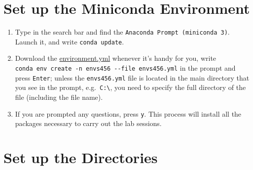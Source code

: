 \documentclass[
  letterpaper,
  DIV=11,
  numbers=noendperiod]{scrreprt}
\providecommand{\tightlist}{%
  \setlength{\itemsep}{0pt}\setlength{\parskip}{0pt}}\usepackage{longtable,booktabs,array}
\begin{document}
\section*{Set up the Miniconda
Environment}\label{set-up-the-miniconda-environment}


\begin{enumerate}
\def\labelenumi{\arabic{enumi}.}
\tightlist
\item
  Type in the search bar and find the
  \texttt{Anaconda\ Prompt\ (miniconda\ 3)}. Launch it, and write
  \texttt{conda\ update}.
\item
  Download the
  \href{https://github.com/GDSL-UL/wma/blob/main/envs456.yml}{environment.yml}
  whenever it's handy for you, write
  \texttt{conda\ env\ create\ -n\ envs456\ -\/-file\ envs456.yml} in the
  prompt and press \texttt{Enter}; unless the \texttt{envs456.yml} file
  is located in the main directory that you see in the prompt,
  e.g.~\texttt{C:\textbackslash{}}, you need to specify the full
  directory of the file (including the file name).
\item
  If you are prompted any questions, press \texttt{y}. This process will
  install all the packages necessary to carry out the lab sessions.
\end{enumerate}

\section*{Set up the Directories}\label{set-up-the-directories}

\end{document}
